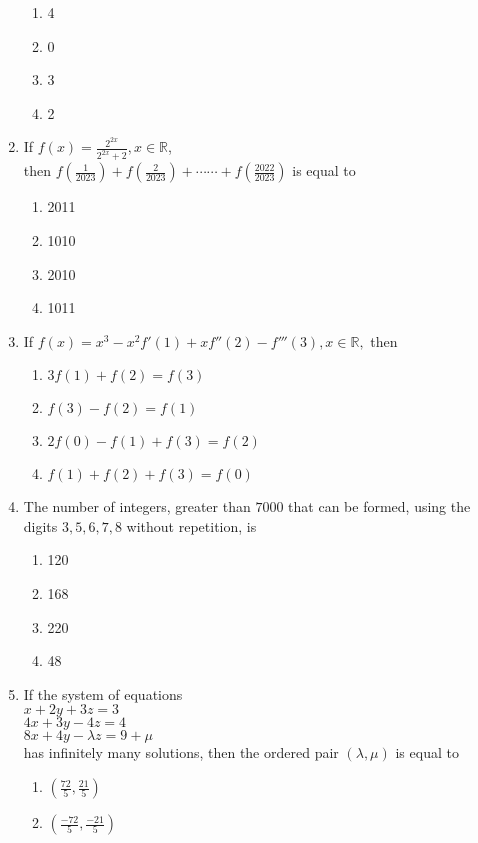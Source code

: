 \documentclass[journal]{IEEEtran}
\begin{document}
\begin{enumerate}
\begin{enumerate}
    \item 4
    \item 0
    \item 3
    \item 2
    \end{enumerate}
    \item If $f(x)=\frac{2^{2x}}{2^{2x}+2}, x \in \mathbb{R}$, \\
    then $f\left( \frac{1}{2023} \right)+f\left( \frac{2}{2023} \right)+\cdots\cdots+f\left( \frac{2022}{2023} \right)$ is equal to
    \begin{enumerate}
        \item 2011
        \item 1010
        \item 2010
        \item 1011
    \end{enumerate}
    \item If $ f(x)=x^{3}-x^{2}f'(1)+xf''(2)-f'''(3), x \in \mathbb{R}, $ then 
    \begin{enumerate}
        \item $ 3f(1) + f(2) = f(3) $
        \item $ f(3)-f(2) = f(1) $
        \item $ 2f(0)-f(1) + f(3) = f(2) $
        \item $ f(1) + f(2) + f(3) = f(0) $
    \end{enumerate}
    \item The number of integers, greater than $7000$ that can
be formed, using the digits $3, 5, 6, 7, 8$ without
repetition, is
\begin{enumerate}
    \item 120
    \item 168
    \item 220
    \item 48
\end{enumerate}
    \item If the system of equations \\
 $ x + 2y + 3z = 3$ \\
$ 4x + 3y-4z = 4$ \\
 $8x + 4y-\lambda z = 9 + \mu $ \\ 
 has infinitely many solutions, then the ordered pair
$(\lambda, \mu)$ is equal to
\begin{enumerate}
    \item $ \left( \frac{72}{5},\frac{21}{5} \right)$
    \item $ \left( \frac{-72}{5},\frac{-21}{5} \right)$

\end{enumerate}
\end{enumerate}
\end{document}
